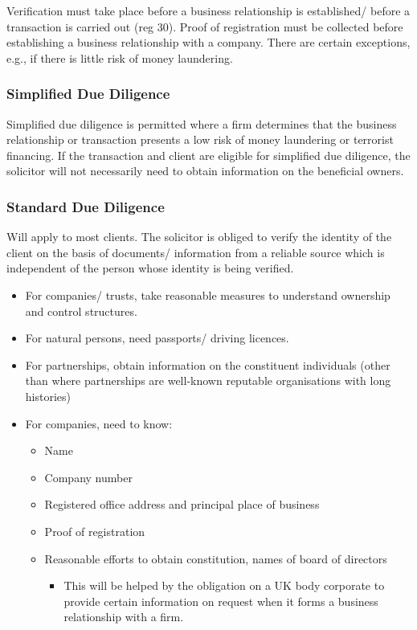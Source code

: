 \documentclass[
]{article}
\providecommand{\tightlist}{%
  \setlength{\itemsep}{0pt}\setlength{\parskip}{0pt}}
\begin{document}
Verification must take place before a business relationship is
established/ before a transaction is carried out (reg 30). Proof of
registration must be collected before establishing a business
relationship with a company. There are certain exceptions, e.g., if
there is little risk of money laundering.

\hypertarget{simplified-due-diligence}{%
\subsubsection{Simplified Due
Diligence}\label{simplified-due-diligence}}

Simplified due diligence is permitted where a firm determines that the
business relationship or transaction presents a low risk of money
laundering or terrorist financing. If the transaction and client are
eligible for simplified due diligence, the solicitor will not
necessarily need to obtain information on the beneficial owners.

\hypertarget{standard-due-diligence}{%
\subsubsection{Standard Due Diligence}\label{standard-due-diligence}}

Will apply to most clients. The solicitor is obliged to verify the
identity of the client on the basis of documents/ information from a
reliable source which is independent of the person whose identity is
being verified.

\begin{itemize}
\tightlist
\item
  For companies/ trusts, take reasonable measures to understand
  ownership and control structures.
\item
  For natural persons, need passports/ driving licences.
\item
  For partnerships, obtain information on the constituent individuals
  (other than where partnerships are well-known reputable organisations
  with long histories)
\item
  For companies, need to know:

  \begin{itemize}
  \tightlist
  \item
    Name
  \item
    Company number
  \item
    Registered office address and principal place of business
  \item
    Proof of registration
  \item
    Reasonable efforts to obtain constitution, names of board of
    directors

    \begin{itemize}
    \tightlist
    \item
      This will be helped by the obligation on a UK body corporate to
      provide certain information on request when it forms a business
      relationship with a firm.
    \end{itemize}
  \end{itemize}
\end{itemize}
\end{document}

